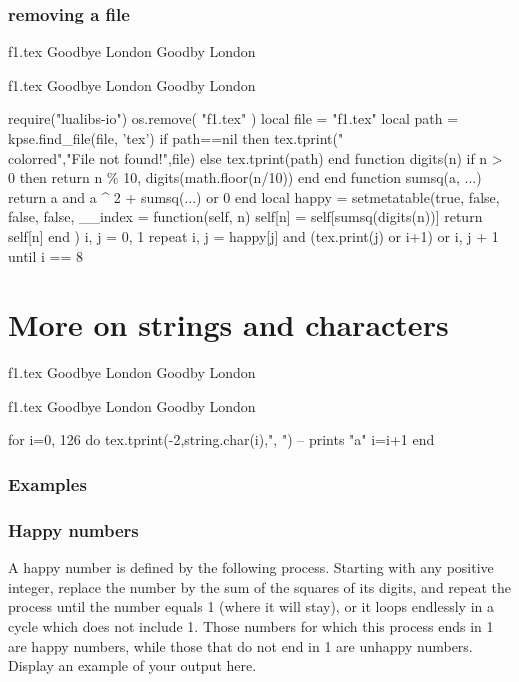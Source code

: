 \documentclass{tufte-book}
\begin{document}
\subsection{removing a file}
\begin{tcblisting}{}
\begin{filecontents*}{f1.tex}
Goodbye London
Goodby London
\end{filecontents*}
\begin{filecontents*}{f1.tex}
Goodbye London
Goodby London
\end{filecontents*}
\begin{luacode}
 require("lualibs-io")
 os.remove( "f1.tex" )
 local file = "f1.tex"
  local path = kpse.find_file(file, 'tex')
    if path==nil then
     tex.tprint({"\\color{red}"},{"File not found!"},{file})
   else
     tex.tprint({path})
   end
function digits(n)
  if n > 0 then return n \% 10, digits(math.floor(n/10)) end
end
function sumsq(a, ...)
  return a and a ^ 2 + sumsq(...) or 0
end
local happy = setmetatable({true, false, false, false}, {
      __index = function(self, n)
         self[n] = self[sumsq(digits(n))]
         return self[n]
      end } )
i, j = 0, 1
repeat
   i, j = happy[j] and (tex.print(j) or i+1) or i, j + 1
until i == 8
\end{luacode}
\end{tcblisting}


\chapter{More on strings and characters}

\begin{tcblisting}{}
\begin{filecontents*}{f1.tex}
Goodbye London
Goodby London
\end{filecontents*}
\begin{filecontents*}{f1.tex}
Goodbye London
Goodby London
\end{filecontents*}
\begin{luacode}
for i=0, 126 do
  tex.tprint({-2,string.char(i)},{", "}) -- prints "a"
  i=i+1
end
\end{luacode}
\end{tcblisting}

\subsection{Examples}
\subsection{Happy numbers}
A happy number is defined by the following process. Starting with any positive integer, replace the number by the sum of the squares of its digits, and repeat the process until the number equals 1 (where it will stay), or it loops endlessly in a cycle which does not include 1. Those numbers for which this process ends in 1 are happy numbers, while those that do not end in 1 are unhappy numbers. Display an example of your output here.
\end{document}
